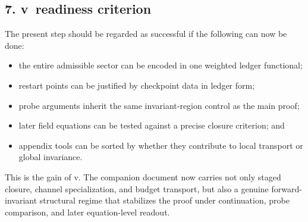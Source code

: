 \subsection*{7. v\docversion\ readiness criterion}
The present step should be regarded as successful if the following can now be done:
\begin{itemize}
  \item the entire admissible sector can be encoded in one weighted ledger functional;
  \item restart points can be justified by checkpoint data in ledger form;
  \item probe arguments inherit the same invariant-region control as the main proof;
  \item later field equations can be tested against a precise closure criterion; and
  \item appendix tools can be sorted by whether they contribute to local transport or global invariance.
\end{itemize}

This is the gain of v\docversion. The companion document now carries not only staged
closure, channel specialization, and budget transport, but also a genuine
forward-invariant structural regime that stabilizes the proof under continuation,
probe comparison, and later equation-level readout.


